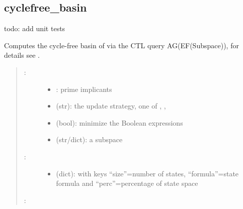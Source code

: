\documentclass[letterpaper,10pt,english]{sphinxmanual}
\begin{document}
\subsection{cyclefree\_basin}
\label{\detokenize{Basins:cyclefree-basin}}\label{\detokenize{Basins:id3}}

\begin{fulllineitems}
\label{\detokenize{Basins:PyBoolNet.Basins.cyclefree_basin}}
todo: add unit tests

Computes the cycle-free basin of  via the CTL query AG(EF(Subspace)), for details see {\hyperref[\detokenize{Bibliography:klarner2018}]{}}.
\begin{quote}
\begin{description}
\item[{:}] \leavevmode\begin{itemize}
\item {} 
: prime implicants

\item {} 
 (str):  the update strategy, one of , , 

\item {} 
 (bool): minimize the Boolean expressions

\item {} 
 (str/dict): a subspace

\end{itemize}

\item[{:}] \leavevmode\begin{itemize}
\item {} 
 (dict): with keys “size”=number of states, “formula”=state formula and “perc”=percentage of state space

\end{itemize}

\end{description}

:


\end{quote}
\end{fulllineitems}
\end{document}
